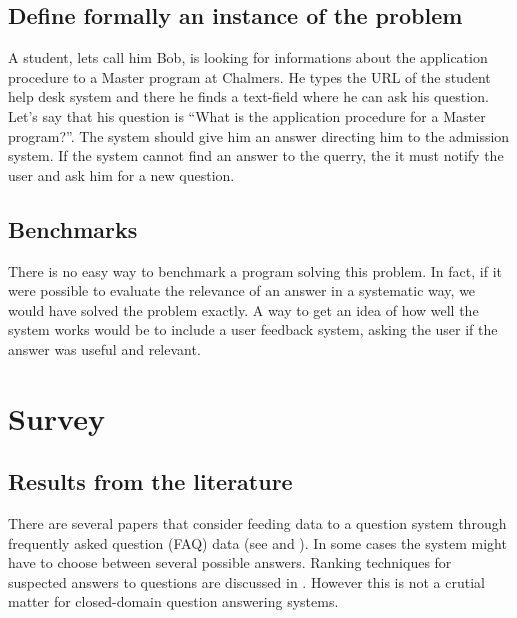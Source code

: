 \documentclass[a4paper,11pt]{article}
\begin{document}
\subsection{Define formally an instance of the problem}
A student, lets call him Bob, is looking for informations about the application
procedure to a Master program at Chalmers. He types the URL of the student help
desk system and there he finds a text-field where he can ask his question. Let's
say that his question is ``What is the application procedure for a Master
program?''. The system should give him an answer directing him to the admission
system. If the system cannot find an answer to the querry, the it must notify the
user and ask him for a new question.

\subsection{Benchmarks}
There is no easy way to benchmark a program solving this problem. In fact, if it
were possible to evaluate the relevance of an answer in a systematic way, we would
have solved the problem exactly. A way to get an idea of how well the system works
would be to include a user feedback system, asking the user if the answer was
useful and relevant.

\section{Survey}
\subsection{Results from the literature}
There are several papers that consider feeding data to a question system through
frequently asked question (FAQ) data (see \cite{evaluatingqasusingfaq} and
\cite{faqfindersys}). In some cases the system might have to choose between
several possible answers. Ranking techniques for suspected answers to questions
are discussed in \cite{rankingsuspected}. However this is not a crutial matter
for closed-domain question answering systems.\\
\end{document}
